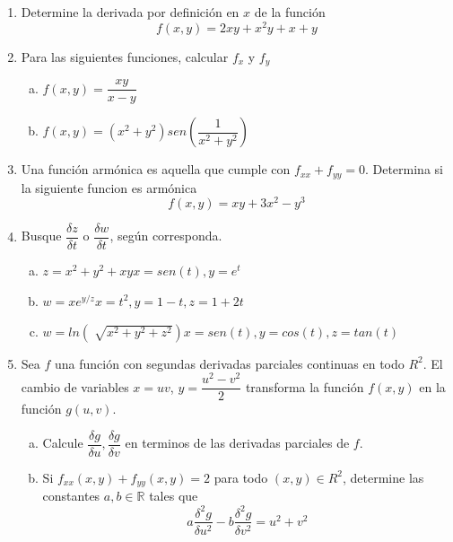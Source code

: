 \documentclass[12pt]{article}
\newenvironment{preguntas}
{\begin{enumerate}\itemsep12pt
	}
	{
	\end{enumerate}
}
\newcommand{\R}{\mathbb{R}}
\begin{document}
\begin{preguntas}
\item Determine la derivada por definición en $x$ de la función
	$$f(x,y) = 2xy + x^2y + x + y$$
\item Para las siguientes funciones, calcular $f_x$ y $f_y$
\begin{enumerate}[a)]
\item $f(x,y) = \dfrac{xy}{x-y}$
\item $f(x,y) = (x^2+y^2)sen\left(\dfrac{1}{x^2+y^2}\right)$
\end{enumerate}
\item Una función armónica es aquella que cumple con $f_{xx} + f_{yy} = 0$. Determina si la siguiente funcion es armónica
	$$f(x,y) = xy + 3x^2 -y^3$$
\item Busque $\dfrac{\delta z}{\delta t}$ o $\dfrac{\delta w}{\delta t}$, según corresponda.
\begin{enumerate}[a)]
\item $z = x^2+y^2+xy$\tab$x=sen(t), y=e^t$
\item $w=xe^{y/z}$\tab$x=t^2, y=1-t, z=1+2t$
\item $w=ln(\sqrt[]{x^2+y^2+z^2})$\tab$x=sen(t), y=cos(t), z=tan(t)$
\end{enumerate}
\item Sea $f$ una función con segundas derivadas parciales continuas en todo $R^2$. El cambio de variables $x=uv$, $y=\dfrac{u^2-v^2}{2}$ transforma la función $f(x,y)$ en la función $g(u,v)$.
\begin{enumerate}[a)]
\item Calcule $\dfrac{\delta g}{\delta u}, \dfrac{\delta g}{\delta v}$ en terminos de las derivadas parciales de $f$.
\item Si $f_{xx}(x,y) + f_{yy}(x,y) = 2$ para todo $(x,y) \in R^2$, determine las constantes $a,b \in \R$ tales que
		$$a\dfrac{\delta^2g}{\delta u^2} - b\dfrac{\delta^2 g}{\delta v^2} = u^2 + v^2$$
\end{enumerate}
\end{preguntas}
\end{document}
